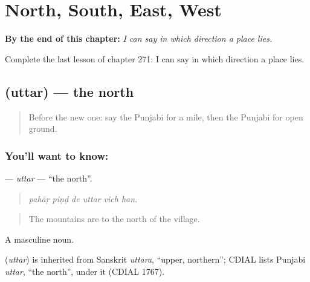
\chapter{North, South, East, West}
\label{ch:pa-a2-north-south-east-west}

\begin{chapteropening}
\textbf{By the end of this chapter:} \emph{I can say in which direction a place lies.}

Complete the last lesson of chapter 271: I can say in which direction a place lies.
\end{chapteropening}

\section[\texorpdfstring{\pa{ਉੱਤਰ} (uttar)}{ਉੱਤਰ (uttar)}]{ (uttar) — the north}

\label{lesson:PA-C271-uttar}



\begin{quote}
Before the new one: say the Punjabi for a mile, then the Punjabi for open ground.
\end{quote}

\subsection*{You'll want to know: }
\textbf{} — \emph{uttar} — \textquotedblleft{}the north\textquotedblright{}.

\begin{quote}
     
\end{quote}

\begin{quote}
\emph{pahāṛ piṇḍ de uttar vich han.}
\end{quote}

\begin{quote}
The mountains are to the north of the village.
\end{quote}

A masculine noun.

\begin{cousinweb}
\textbf{} (\emph{uttar}) is inherited from Sanskrit \emph{uttara}, \textquotedblleft{}upper, northern\textquotedblright{}; CDIAL lists Punjabi \emph{uttar}, \textquotedblleft{}the north\textquotedblright{}, under it (CDIAL 1767).
\end{cousinweb}

